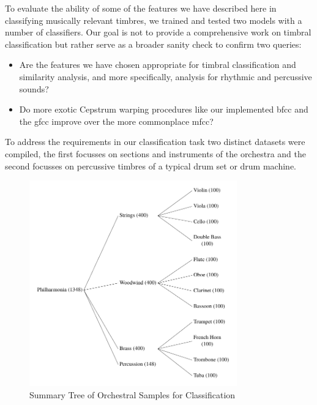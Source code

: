 {{{{To evaluate the ability of some of the features we have described here in classifying musically relevant timbres, we trained and tested two models with a number of classifiers. Our goal is not to provide a comprehensive work on timbral classification but rather serve as a broader sanity check to confirm two queries:

\begin{itemize}
  \item Are the features we have chosen appropriate for timbral classification and similarity analysis, and more specifically, analysis for rhythmic and percussive sounds?
  \item Do more exotic Cepstrum warping procedures like our implemented \acrshort{bfcc} and the \acrshort{gfcc} improve over the more commonplace \acrshort{mfcc}?
\end{itemize}

To address the requirements in our classification task two distinct datasets were compiled, the first focusses on sections and instruments of the orchestra and the second focusses on percussive timbres of a typical drum set or drum machine.

\begin{figure}
	\begin{center}
		\includegraphics[width=0.8\textwidth]{ch05_pyconcat/figures/orch_distribution.pdf}
	\end{center}
	\caption[Summary Tree of Orchestral Samples for Classification]{Summary Tree of Orchestral Samples for Classification}
	\label{fig:orch_distribution}
\end{figure}

}}}}
